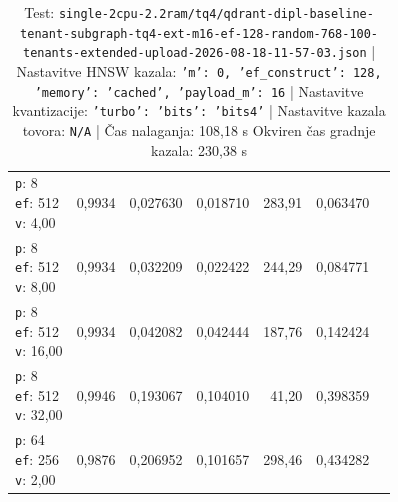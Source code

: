 \begin{table}[htbp]
\begin{tabularx}{\textwidth}{Xrrrrrr}
    \makecell{\texttt{p}: 8\\\texttt{ef}: 512\\\texttt{v}: 4,00} & 0,9934 & 0,027630 & 0,018710 & 283,91 & 0,063470 \\
    \makecell{\texttt{p}: 8\\\texttt{ef}: 512\\\texttt{v}: 8,00} & 0,9934 & 0,032209 & 0,022422 & 244,29 & 0,084771 \\
    \makecell{\texttt{p}: 8\\\texttt{ef}: 512\\\texttt{v}: 16,00} & 0,9934 & 0,042082 & 0,042444 & 187,76 & 0,142424 \\
    \makecell{\texttt{p}: 8\\\texttt{ef}: 512\\\texttt{v}: 32,00} & 0,9946 & 0,193067 & 0,104010 & 41,20 & 0,398359 \\
    \makecell{\texttt{p}: 64\\\texttt{ef}: 256\\\texttt{v}: 2,00} & 0,9876 & 0,206952 & 0,101657 & 298,46 & 0,434282 \\
    \bottomrule
  \end{tabularx}
\caption* {Test: \texttt{single-2cpu-2.2ram/tq4/qdrant-dipl-baseline-tenant-subgraph-tq4-ext-m16-ef-128-random-768-100-tenants-extended-upload-2026-08-18-11-57-03.json} | Nastavitve HNSW kazala: \texttt{{'m': 0, 'ef\_construct': 128, 'memory': 'cached', 'payload\_m': 16}} | Nastavitve kvantizacije: \texttt{{'turbo': {'bits': 'bits4'}}} | Nastavitve kazala tovora: \texttt{N/A} | Čas nalaganja: 108,18 s Okviren čas gradnje kazala: 230,38 s}\end{table}


